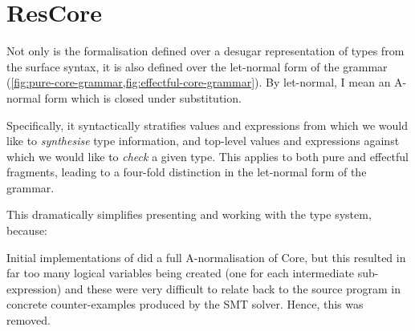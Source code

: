 \section{ResCore}

Not only is the formalisation defined over a desugar representation of types
from the surface  syntax, it is also defined over the let-normal form of
the  grammar
(\cref{fig:pure-core-grammar,fig:effectful-core-grammar}). By let-normal, I
mean an A-normal form which is closed under
substitution.

Specifically, it syntactically stratifies values and
expressions from which we would like to \emph{synthesise} type information, and
top-level values and expressions against which we would like to \emph{check} a
given type. This applies to both pure and effectful fragments, leading to a
four-fold distinction in the let-normal form of the grammar.

This dramatically simplifies presenting and working with the type system, because:

Initial implementations of  did a full A-normalisation of Core, but this resulted
in far too many logical variables being created (one for each intermediate
sub-expression) and these were very difficult to relate back to the source
program in concrete counter-examples produced by the SMT
solver. Hence, this was
removed.\label{sn:rm-anorm}

